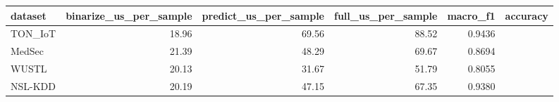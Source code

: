 \begin{tabular}{lrrrrr}
\toprule
dataset & binarize\_us\_per\_sample & predict\_us\_per\_sample & full\_us\_per\_sample & macro\_f1 & accuracy \\
\midrule
TON\_IoT & 18.96 & 69.56 & 88.52 & 0.9436 &  \\
MedSec & 21.39 & 48.29 & 69.67 & 0.8694 &  \\
WUSTL & 20.13 & 31.67 & 51.79 & 0.8055 &  \\
NSL-KDD & 20.19 & 47.15 & 67.35 & 0.9380 &  \\
\bottomrule
\end{tabular}
